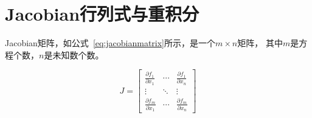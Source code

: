 \documentclass[UTF8]{ctexart}
\begin{document}
\section{Jacobian行列式与重积分}

Jacobian矩阵，如公式~\ref{eq:jacobianmatrix}所示，是一个$m\times n$矩阵，
其中$m$是方程个数，$n$是未知数个数。

\begin{equation}
    \label{eq:jacobianmatrix}
    J = \begin{bmatrix}
        \frac{\partial f_1}{\partial x_1} & \cdots & \frac{\partial f_1}{\partial x_n} \\
        \vdots  & \ddots & \vdots \\
        \frac{\partial f_m}{\partial x_1} & \cdots & \frac{\partial f_m}{\partial x_n}
    \end{bmatrix}
\end{equation}

\newpage



\end{document}
